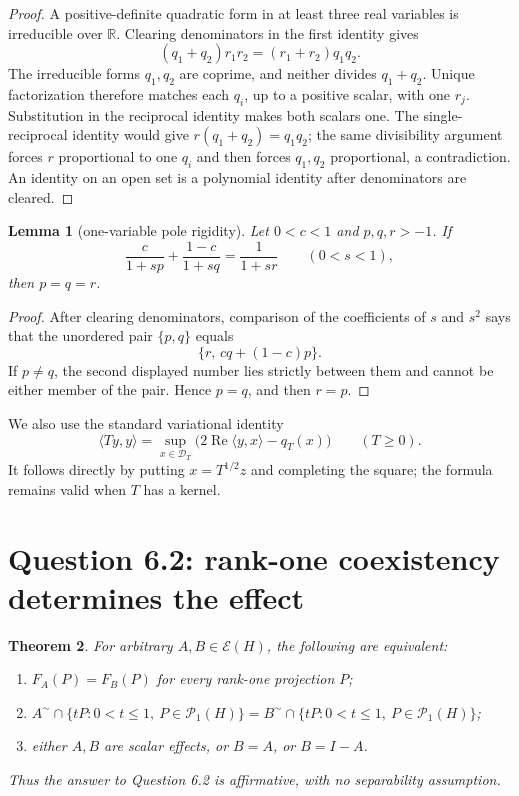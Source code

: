 \documentclass[11pt]{article}
\newtheorem{theorem}{Theorem}
\newtheorem{lemma}[theorem]{Lemma}
\newcommand{\E}{\mathcal E}
\newcommand{\Proj}{\mathcal P}
\newcommand{\coex}{\mathord{\sim}}
\begin{document}
\begin{proof}
A positive-definite quadratic form in at least three real variables is irreducible over $\mathbb R$.  Clearing denominators in the first identity gives
\[
 (q_1+q_2)r_1r_2=(r_1+r_2)q_1q_2.
\]
The irreducible forms $q_1,q_2$ are coprime, and neither divides $q_1+q_2$.  Unique factorization therefore matches each $q_i$, up to a positive scalar, with one $r_j$.  Substitution in the reciprocal identity makes both scalars one.  The single-reciprocal identity would give $r(q_1+q_2)=q_1q_2$; the same divisibility argument forces $r$ proportional to one $q_i$ and then forces $q_1,q_2$ proportional, a contradiction.  An identity on an open set is a polynomial identity after denominators are cleared.
\end{proof}

\begin{lemma}[one-variable pole rigidity]\label{lem:poles}
Let $0<c<1$ and $p,q,r>-1$.  If
\[
 \frac{c}{1+sp}+\frac{1-c}{1+sq}=\frac1{1+sr}
 \qquad(0<s<1),
\]
then $p=q=r$.
\end{lemma}

\begin{proof}
After clearing denominators, comparison of the coefficients of $s$ and $s^2$ says that the unordered pair $\{p,q\}$ equals
\[
 \{r,\,c q+(1-c)p\}.
\]
If $p\ne q$, the second displayed number lies strictly between them and cannot be either member of the pair.  Hence $p=q$, and then $r=p$.
\end{proof}

We also use the standard variational identity
\begin{equation}\label{eq:variational}
 \langle Ty,y\rangle
 =\sup_{x\in\mathcal D_T}
 \bigl(2\operatorname{Re}\langle y,x\rangle-q_T(x)\bigr)
 \qquad(T\ge0).
\end{equation}
It follows directly by putting $x=T^{1/2}z$ and completing the square; the formula remains valid when $T$ has a kernel.

\section{Question 6.2: rank-one coexistency determines the effect}

\begin{theorem}\label{thm:rankone}
For arbitrary $A,B\in\E(H)$, the following are equivalent:
\begin{enumerate}
\item $F_A(P)=F_B(P)$ for every rank-one projection $P$;
\item $A^{\coex}\cap\{tP:0<t\le1,\ P\in\Proj_1(H)\}
      =B^{\coex}\cap\{tP:0<t\le1,\ P\in\Proj_1(H)\}$;
\item either $A,B$ are scalar effects, or $B=A$, or $B=I-A$.
\end{enumerate}
Thus the answer to Question 6.2 is affirmative, with no separability assumption.
\end{theorem}
\end{document}
